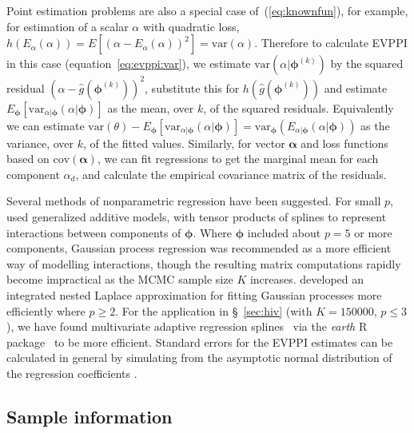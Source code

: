 \documentclass[12pt]{article}\usepackage[]{graphicx}\usepackage[]{color}
\newcommand{\cov}{\mbox{cov}}
\newcommand{\var}{\mbox{var}}
\begin{document}
Point estimation problems are also a special case of~(\ref{eq:knownfun}), for example, for estimation of a scalar $\alpha$ with quadratic loss, $h(E_{\alpha}(\alpha)) = E[(\alpha - E_\alpha(\alpha))^2] = \var(\alpha)$.  Therefore to calculate EVPPI in this case (equation~\ref{eq:evppi:var}), we estimate $\var(\alpha|\bm\phi^{(k)})$ by the squared residual $(\alpha - \hat g(\bm\phi^{(k)}))^2$, substitute this for $h(\hat g(\bm\phi^{(k)}))$ and estimate $E_{\bm\phi}\left[\var_{\alpha|\bm\phi}(\alpha | \bm\phi)\right]$ as the mean, over $k$, of the squared residuals.  Equivalently we can estimate $\var(\theta) - E_{\bm\phi}\left[\var_{\alpha|\bm\phi}(\alpha|\bm\phi)\right] = \var_{\bm\phi}(E_{\alpha|\bm\phi}(\alpha|\bm\phi))$ as the variance, over $k$, of the fitted values.  Similarly, for vector $\bm\alpha$ and loss functions based on $\cov(\bm\alpha)$, we can fit regressions to get the marginal mean for each component $\alpha_d$, and calculate the empirical covariance matrix of the residuals.

Several methods of nonparametric regression have been suggested.  For small $p$, \citet{strong:oakley:multievppi} used generalized additive models, with tensor products of splines to represent interactions between components of $\bm\phi$.  Where $\bm\phi$ included about $p=5$ or more components, Gaussian process regression was recommended as a more efficient way of modelling interactions, though the resulting matrix computations rapidly become impractical as the MCMC sample size $K$ increases.  \citet{heath2015efficient} developed an integrated nested Laplace approximation for fitting Gaussian processes more efficiently where $p\geq 2$.  For the application in \S~\ref{sec:hiv} (with $K=150000$, $p\leq 3$), we have found multivariate adaptive regression splines~\citep{friedman1991multivariate} via the \emph{earth} R package~\citep{earthpackage} to be more efficient.    Standard errors for the EVPPI estimates can be calculated in general by simulating from the asymptotic normal distribution of the regression coefficients \citep{mandel:simci}.




\subsection{Sample information}
\label{sec:evsi:comp}
\end{document}
